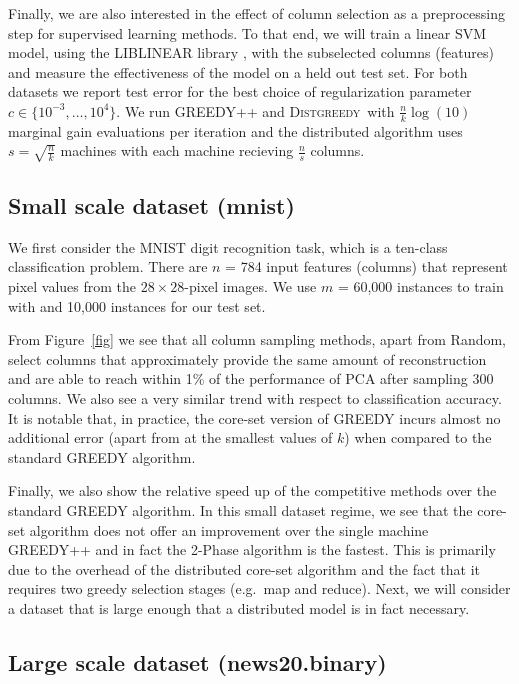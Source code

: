 \documentclass{article}
\newcommand{\distgreedy}{\textsc{Distgreedy}}
\begin{document}
Finally, we are also interested in the effect of column selection as a
preprocessing step for supervised learning methods. To that end, we will train
a linear SVM model, using the LIBLINEAR library \citep{fan2008}, with the
subselected columns (features) and measure the effectiveness of the model on a
held out test set. For both datasets we report test error for the best
choice of regularization parameter $c \in \{10^{-3}, \ldots, 10^4\}$.
We run GREEDY++ and \distgreedy\ with $\frac{n}{k}\log(10)$
marginal gain evaluations per iteration and the distributed
algorithm uses $s = \sqrt{\frac{n}{k}}$ machines with each machine
recieving $\frac{n}{s}$ columns.


\subsection{Small scale dataset (mnist)}
We first consider the MNIST digit recognition task, which is a
ten-class classification problem. There are $n$ = 784 input features
(columns) that represent pixel values from the $28\times28$-pixel
images. We use $m$ = 60,000 instances to train with and 10,000 instances
for our test set.

From Figure~\ref{fig} we see that all column sampling methods, apart
from Random, select columns that approximately provide the same amount
of reconstruction and are able to reach within 1\% of the performance
of PCA after sampling 300 columns. We also see a very similar trend
with respect to classification accuracy. It is notable that, in
practice, the core-set version of GREEDY incurs almost no additional
error (apart from at the smallest values of $k$) when compared to the
standard GREEDY algorithm.

Finally, we also show the relative speed up of the competitive methods
over the standard GREEDY algorithm. In this small dataset regime, we
see that the core-set algorithm does not offer an improvement over the single
machine GREEDY++ and in fact the 2-Phase algorithm is the fastest.
This is primarily due to the overhead of the distributed core-set
algorithm and the fact that it requires two greedy selection stages
(e.g.\ map and reduce). Next, we will consider a dataset that is large enough that a distributed model is in fact necessary. 

\subsection{Large scale dataset (news20.binary)}
\end{document}
